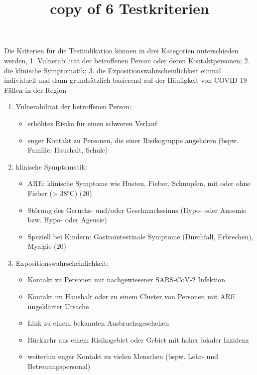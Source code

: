 \documentclass{article}
\begin{document}
\title{copy of 6 Testkriterien }

\maketitle


Die Kriterien für die Testindikation können in drei Kategorien unterschieden werden, 1. Vulnerabilität der betroffenen Person oder deren Kontaktpersonen; 2. die klinische Symptomatik; 3. die Expositionswahrscheinlichkeit einmal individuell und dann grundsätzlich basierend auf der Häufigkeit von COVID-19 Fällen in der Region 

\begin{enumerate}
\item Vulnerabilität der betroffenen Person: 

\begin{itemize}
\item  erhöhtes Risiko für einen schweren Verlauf 


\item  enger Kontakt zu Personen, die einer Risikogruppe angehören (bspw. Familie, Haushalt, Schule) 


\end{itemize}

\item klinische Symptomatik: 

\begin{itemize}
\item ARE: klinische Symptome wie Husten, Fieber, Schnupfen, mit oder ohne Fieber (> 38°C) (20) 


\item Störung des Geruchs- und/oder Geschmackssinns (Hypo- oder Anosmie bzw. Hypo- oder Ageusie) 


\item Speziell bei Kindern: Gastrointestinale Symptome (Durchfall, Erbrechen), Myalgie (20)


\end{itemize}

\item Expositionswahrscheinlichkeit:

\begin{itemize}
\item Kontakt zu Personen mit nachgewiesener SARS-CoV-2 Infektion


\item Kontakt im Haushalt oder zu einem Cluster von Personen mit ARE ungeklärter Ursache 


\item Link zu einem bekannten Ausbruchsgeschehen 


\item Rückkehr aus einem Risikogebiet oder Gebiet mit hoher lokaler Inzidenz 


\item weiterhin enger Kontakt zu vielen Menschen (bspw. Lehr- und Betreuungspersonal)


\end{itemize}

\end{enumerate}
\end{document}
